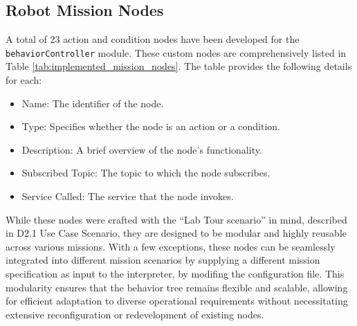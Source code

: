 \documentclass{CSSRforAfrica}
\begin{document}
\newpage
\subsection{Robot Mission Nodes}

A total of \textnormal{23 action and condition nodes} have been developed for the \texttt{\small behaviorController} module. These custom nodes are comprehensively listed in \textnormal{Table \ref{tab:implemented_mission_nodes}}. The table provides the following details for each:

\begin{itemize}
    \item \textnormal{Name}: The identifier of the node.
    \item \textnormal{Type}: Specifies whether the node is an action or a condition.
    \item \textnormal{Description}: A brief overview of the node's functionality.
    \item \textnormal{Subscribed Topic}: The topic to which the node subscribes.
    \item \textnormal{Service Called}: The service that the node invokes.
\end{itemize}


While these nodes were crafted with the ``Lab Tour scenario'' in mind, described in \textnormal{D2.1 Use Case Scenario}, they are designed to be \textnormal{modular and highly reusable} across various missions. With a few exceptions, these nodes can be seamlessly integrated into different mission scenarios by supplying a different mission specification as input to the interpreter, by modifing the configuration file. This modularity ensures that the behavior tree remains flexible and scalable, allowing for efficient adaptation to diverse operational requirements without necessitating extensive reconfiguration or redevelopment of existing nodes.
\end{document}
